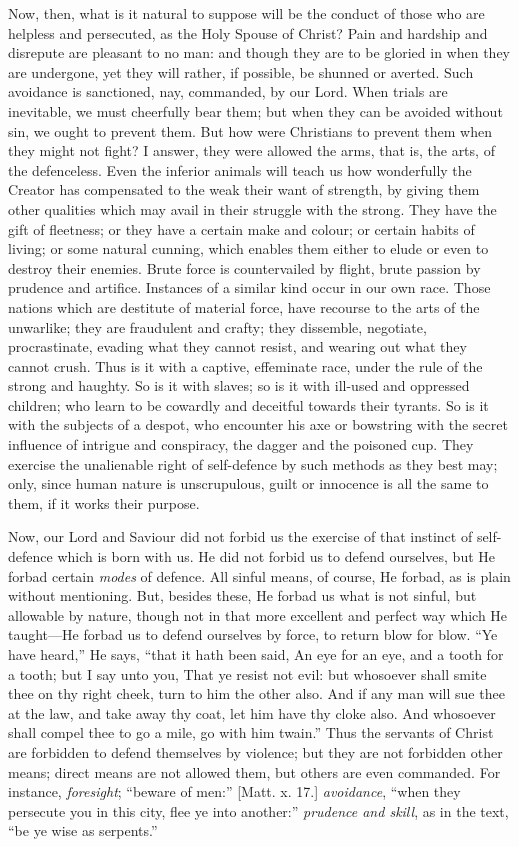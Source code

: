 Now, then, what is it natural to suppose will be the conduct of
those who are helpless and persecuted, as the Holy Spouse of Christ?
Pain and hardship and disrepute are pleasant to no man: and though
they are to be gloried in when they are undergone, yet they will
rather, if possible, be shunned or averted. Such avoidance is
sanctioned, nay, commanded, by our Lord. When trials are inevitable,
we must cheerfully bear them; but when they can be avoided without
sin, we ought to prevent them. But how were Christians to prevent them
when they might not fight? I answer, they were allowed the arms, that
is, the arts, of the defenceless. Even the inferior animals will teach
us how wonderfully the Creator has compensated to the weak their want
of strength, by giving them other qualities which may avail in their
struggle with the strong. They have the gift of fleetness; or they
have a certain make and colour; or certain habits of living; or some
natural cunning, which enables them either to elude or even to destroy
their enemies. Brute force is countervailed by flight, brute passion
by prudence and artifice. Instances of a similar kind occur in our own
race. Those nations which are destitute of material force, have
recourse to the arts of the unwarlike; they are fraudulent and crafty;
they dissemble, negotiate, procrastinate, evading what they cannot
resist, and wearing out what they cannot crush. Thus is it with a
captive, effeminate race, under the rule of the strong and haughty. So
is it with slaves; so is it with ill-used and oppressed children; who
learn to be cowardly and deceitful towards their tyrants. So is it
with the subjects of a despot, who encounter his axe or bowstring with
the secret influence of intrigue and conspiracy, the dagger and the
poisoned cup. They exercise the unalienable right of self-defence by
such methods as they best may; only, since human nature is
unscrupulous, guilt or innocence is all the same to them, if it works
their purpose.

Now, our Lord and Saviour did not forbid us the exercise of that
instinct of self-defence which is born with us. He did not forbid us
to defend ourselves, but He forbad certain \emph{modes} of defence.
All sinful means, of course, He forbad, as is plain without
mentioning. But, besides these, He forbad us what is not sinful, but
allowable by nature, though not in that more excellent and perfect way
which He taught—He forbad us to defend ourselves by force, to return
blow for blow. ``Ye have heard,'' He says, ``that it hath
been said, An eye for an eye, and a tooth for a tooth; but I say unto
you, That ye resist not evil: but whosoever shall smite thee on thy
right cheek, turn to him the other also. And if any man will sue thee
at the law, and take away thy coat, let him have thy cloke also. And
whosoever shall compel thee to go a mile, go with him twain.''
Thus the servants of Christ are forbidden to defend themselves by
violence; but they are not forbidden other means; direct means are not
allowed them, but others are even commanded. For instance, \emph{foresight};
``beware of men:'' [Matt. x. 17.] \emph{avoidance}, ``when
they persecute you in this city, flee ye into another:'' \emph{prudence
and skill}, as in the text, ``be ye wise as serpents.''


